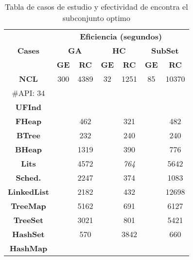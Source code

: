 \begin{table}[t]
\centering
\label{tab:t1}
\scriptsize
\begin{tabular}{|c c|cc|cc|cc|}
\midrule
\multicolumn{2}{|c|}{\multirow{3}{*}{\textbf{Cases}}} & \multicolumn{6}{c|}{\textbf{Eficiencia (segundos)}} \\
\cline{3-8}
\multicolumn{2}{|c|}{} & \multicolumn{2}{c}{\textbf{GA}} & \multicolumn{2}{c}{\textbf{HC}} & \multicolumn{2}{c|}{\textbf{SubSet}} \\
\multicolumn{2}{|c|}{} & \textbf{\tiny{GE}} & \textbf{\tiny{RC}} & \textbf{\tiny{GE}} & \textbf{\tiny{RC}} & \textbf{\tiny{GE}} & \textbf{\tiny{RC}} \\
\midrule
\multicolumn{2}{|c|}{\textbf{NCL}} & 300  & 4389   & 32 &  1251 &85 & 10370 \\
 \multicolumn{2}{|c|}{\scriptsize \#API: 34}&   &   &   &   &   &      \\
\midrule
\multicolumn{2}{|c|}{\textbf{UFInd}}&   &   &   &   &   &      \\
\midrule

\multicolumn{2}{|c|}{\textbf{FHeap}} &   & 462  &   &321   &   &  482   \\
\midrule

\multicolumn{2}{|c|}{\textbf{BTree}} &   &  232 &   & 240   &   & 240   \\
\midrule

\multicolumn{2}{|c|}{\textbf{BHeap}} &   &  1319 &   & 390  &   &  776   \\
\midrule

\multicolumn{2}{|c|}{\textbf{Lits}} &   & 4572  &   &  \emph{764} &   & 5642   \\
\midrule

\multicolumn{2}{|c|}{\textbf{Sched.}} &   & 2247  &   & 374  &   &1083    \\

\midrule
\multicolumn{2}{|c|}{\textbf{LinkedList}} &  &  2182 &   &  432 &  &  12698  \\
\midrule

\multicolumn{2}{|c|}{\textbf{TreeMap}} &   &  5162 &   & 691  &   &   6127  \\
\midrule

\multicolumn{2}{|c|}{\textbf{TreeSet}} &   & 3021  &   & 801  &   &  5421  \\
\midrule

\multicolumn{2}{|c|}{\textbf{HashSet}} &   &  570 &   &  3842 &   &   660 \\
\midrule

\multicolumn{2}{|c|}{\textbf{HashMap}} &   &   &   &   &   &    \\
\hline
\end{tabular}

\caption{Tabla de casos de estudio y efectividad de encontra el subconjunto optimo}
\label{tab:eficiencia}
\end{table}

